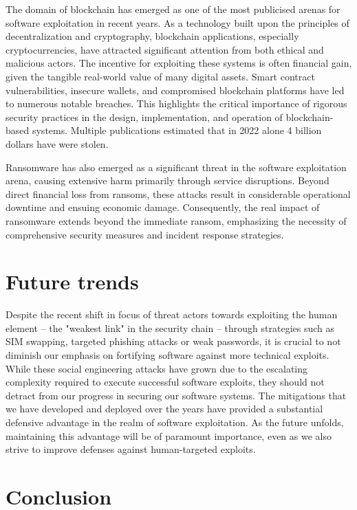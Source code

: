 \documentclass{article}
\begin{document}
The domain of blockchain has emerged as one of the most publicised arenas for
software exploitation in recent years. As a technology built upon the principles
of decentralization and cryptography, blockchain applications, especially
cryptocurrencies, have attracted significant attention from both ethical and
malicious actors. The incentive for exploiting these systems is often financial
gain, given the tangible real-world value of many digital assets. Smart contract
vulnerabilities, insecure wallets, and compromised blockchain platforms have led
to numerous notable breaches. This highlights the critical importance of
rigorous security practices in the design, implementation, and operation of
blockchain-based systems. Multiple publications estimated that in 2022 alone
4 billion dollars have were stolen.

Ransomware has also emerged as a significant threat in the software exploitation
arena, causing extensive harm primarily through service disruptions. Beyond
direct financial loss from ransoms, these attacks result in considerable
operational downtime and ensuing economic damage. Consequently, the real impact
of ransomware extends beyond the immediate ransom, emphasizing the necessity of
comprehensive security measures and incident response strategies.

\section{Future trends}%
Despite the recent shift in focus of threat actors towards exploiting the human
element -- the "weakest link" in the security chain -- through strategies such
as SIM swapping, targeted phishing attacks or weak passwords, it is crucial to
not diminish our emphasis on fortifying software against more technical
exploits. While these social engineering attacks have grown due to the
escalating complexity required to execute successful software exploits, they
should not detract from our progress in securing our software systems. The
mitigations that we have developed and deployed over the years have provided a
substantial defensive advantage in the realm of software exploitation. As the
future unfolds, maintaining this advantage will be of paramount importance, even
as we also strive to improve defenses against human-targeted
exploits.

\section{Conclusion}

\printbibheading
\printbibliography
\end{document}
